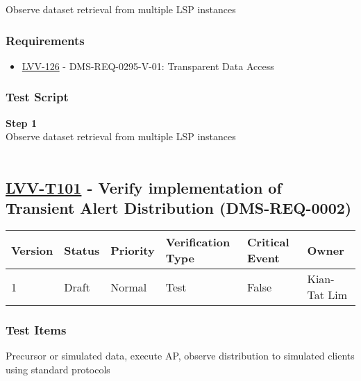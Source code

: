 Observe dataset retrieval from multiple LSP instances

\hypertarget{requirements-77}{%
\subsubsection{Requirements}\label{requirements-77}}

\begin{itemize}
\tightlist
\item
  \href{https://jira.lsstcorp.org/browse/LVV-126}{LVV-126} -
  DMS-REQ-0295-V-01: Transparent Data Access
\end{itemize}

\hypertarget{test-script-77}{%
\subsubsection{Test Script}\label{test-script-77}}

\textbf{Step 1}\\
Observe dataset retrieval from multiple LSP instances\\
~\\

\hypertarget{lvv-t101---verify-implementation-of-transient-alert-distribution-dms-req-0002}{%
\subsection{\texorpdfstring{\href{https://jira.lsstcorp.org/secure/Tests.jspa\#/testCase/LVV-T101}{LVV-T101}
- Verify implementation of Transient Alert Distribution
(DMS-REQ-0002)}{LVV-T101 - Verify implementation of Transient Alert Distribution (DMS-REQ-0002)}}\label{lvv-t101---verify-implementation-of-transient-alert-distribution-dms-req-0002}}

\begin{longtable}[]{@{}llllll@{}}
\toprule
Version & Status & Priority & Verification Type & Critical Event &
Owner\tabularnewline
\midrule
\endhead
1 & Draft & Normal & Test & False & Kian-Tat Lim\tabularnewline
\bottomrule
\end{longtable}

\hypertarget{test-items-77}{%
\subsubsection{Test Items}\label{test-items-77}}

Precursor or simulated data, execute AP, observe distribution to
simulated clients using standard protocols

